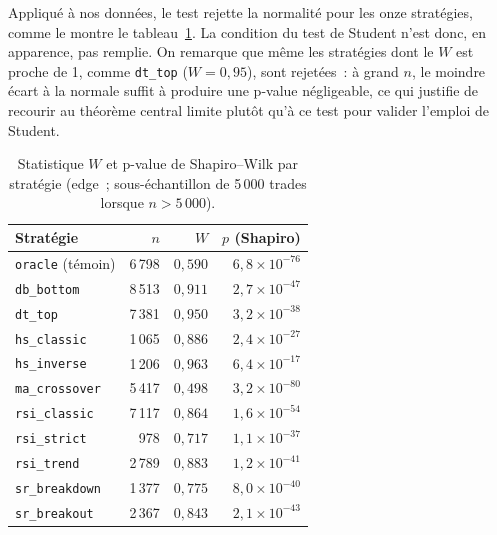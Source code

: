 Appliqué à nos données, le test rejette la normalité pour les onze
stratégies, comme le montre le tableau~\ref{tab:shapiro}. La condition du
test de Student n'est donc, en apparence, pas remplie. On remarque que même
les stratégies dont le \(W\) est proche de 1, comme \texttt{dt\_top}
($W = 0{,}95$), sont rejetées~: à grand \(n\), le moindre écart à la normale
suffit à produire une p-value négligeable, ce qui justifie de recourir au
théorème central limite plutôt qu'à ce test pour valider l'emploi de Student.

\begin{table}[H]
\centering
\caption{Statistique \(W\) et p-value de Shapiro--Wilk par stratégie
(edge~; sous-échantillon de 5\,000 trades lorsque \(n > 5\,000\)).}
\label{tab:shapiro}
\small
\begin{tabular}{@{}lrrr@{}}
\toprule
Stratégie & $n$ & $W$ & $p$ (Shapiro) \\
\midrule
\texttt{oracle} (témoin) & 6\,798 & $0{,}590$ & $6{,}8\times10^{-76}$ \\
\midrule
\texttt{db\_bottom}    & 8\,513 & $0{,}911$ & $2{,}7\times10^{-47}$ \\
\texttt{dt\_top}       & 7\,381 & $0{,}950$ & $3{,}2\times10^{-38}$ \\
\texttt{hs\_classic}   & 1\,065 & $0{,}886$ & $2{,}4\times10^{-27}$ \\
\texttt{hs\_inverse}   & 1\,206 & $0{,}963$ & $6{,}4\times10^{-17}$ \\
\texttt{ma\_crossover} & 5\,417 & $0{,}498$ & $3{,}2\times10^{-80}$ \\
\texttt{rsi\_classic}  & 7\,117 & $0{,}864$ & $1{,}6\times10^{-54}$ \\
\texttt{rsi\_strict}   &   978  & $0{,}717$ & $1{,}1\times10^{-37}$ \\
\texttt{rsi\_trend}    & 2\,789 & $0{,}883$ & $1{,}2\times10^{-41}$ \\
\texttt{sr\_breakdown} & 1\,377 & $0{,}775$ & $8{,}0\times10^{-40}$ \\
\texttt{sr\_breakout}  & 2\,367 & $0{,}843$ & $2{,}1\times10^{-43}$ \\
\bottomrule
\end{tabular}
\end{table}

